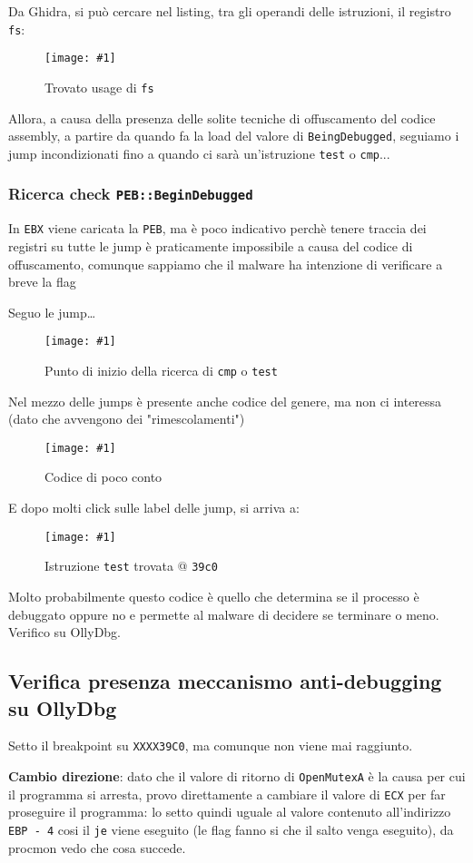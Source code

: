 \documentclass[
    a4paper, %
    11pt %
]{article}
\newcommand{\pic}[4]{\begin{figure}[H]
            \centering
            \texttt{[image: \#1]}
            \caption{#2}
            \label{fig:#1}
            \end{figure}}
\begin{document}
            Da Ghidra, si può cercare nel listing, tra gli operandi delle istruzioni, il registro
            \texttt{fs}:

            \pic{antidbg_fsfound}{Trovato usage di \texttt{fs}}{17cm}{9cm}

            Allora, a causa della presenza delle solite tecniche di offuscamento del codice assembly,
            a partire da quando fa la load del valore di \texttt{BeingDebugged}, seguiamo i jump
            incondizionati fino a quando ci sarà un'istruzione \texttt{test} o \texttt{cmp}...

            \subsubsection{Ricerca check \texttt{PEB::BeginDebugged}}
            In \texttt{EBX} viene caricata la \texttt{PEB}, ma è poco indicativo perchè tenere
            traccia dei registri su tutte le jump è praticamente impossibile a causa del codice di 
            offuscamento, comunque sappiamo che il malware ha intenzione di verificare a breve la flag
            
            Seguo le jump\dots
            \pic{antidbg_startingpoint}{Punto di inizio della ricerca di \texttt{cmp} o \texttt{test}}
            {7cm}{3cm}

            Nel mezzo delle jumps è presente anche codice del genere, ma non ci interessa
            (dato che avvengono dei "rimescolamenti")
            \pic{antidbg_aftersomejmps}{Codice di poco conto}{8cm}{1cm}

            \pagebreak
            
            E dopo molti click sulle label delle jump, si arriva a:
            \pic{antidbg_test}{Istruzione \texttt{test} trovata @ \texttt{39c0}}{7cm}{3cm}

            Molto probabilmente questo codice è quello che determina se il processo è debuggato oppure no
            e permette al malware di decidere se terminare o meno. Verifico su OllyDbg.

            \subsection{Verifica presenza meccanismo anti-debugging su OllyDbg}

            Setto il breakpoint su \texttt{XXXX39C0}, ma comunque non viene mai raggiunto.

            \textbf{Cambio direzione}: dato che il valore di ritorno di \texttt{OpenMutexA} è la causa per
            cui il programma si arresta, provo direttamente a cambiare il valore di \texttt{ECX} per far
            proseguire il programma: lo setto quindi uguale al valore contenuto all'indirizzo \texttt{EBP - 4} cosi il \texttt{je} viene
            eseguito (le flag fanno si che il salto venga eseguito), da procmon vedo che cosa succede.
\end{document}

